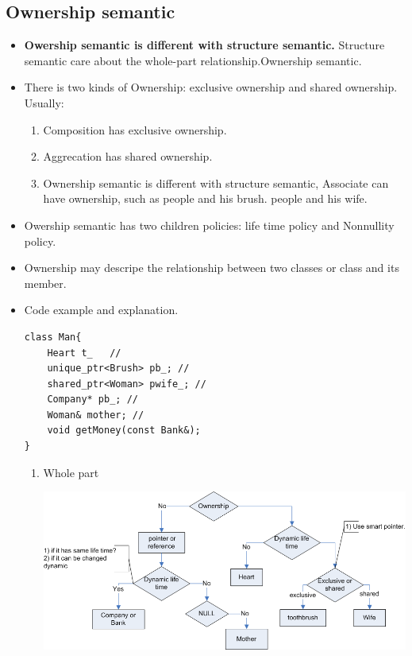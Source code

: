 \documentclass[a4paper,11pt,twoside]{book}
\begin{document}
\subsection{Ownership semantic}
\begin{itemize}
	\item \textbf{Owership semantic is different with structure semantic.} Structure semantic care about the whole-part relationship.Ownership semantic. 
	
	\item There is two kinds of Ownership: exclusive ownership and shared ownership. Usually:
	\begin{enumerate}
		\item Composition has exclusive ownership.
		\item Aggrecation has shared ownership.
		\item Ownership semantic is different with structure semantic, Associate can have ownership, such as people and his brush. people and his wife.
	\end{enumerate}
	
	\item Owership semantic has two children policies: life time policy and Nonnullity policy. 
	
	\item Ownership may descripe the relationship between two classes or class and its member.
	
	\item Code example and explanation. 
\begin{lstlisting}
class Man{
	Heart t_   //
	unique_ptr<Brush> pb_; //
	shared_ptr<Woman> pwife_; // 
	Company* pb_; //
	Woman& mother; //
	void getMoney(const Bank&);
}
\end{lstlisting}
\begin{enumerate}
\item Whole part

	\centering
	\includegraphics[width=0.9\linewidth]{pics/owner.png}


\end{enumerate}
\end{itemize}
\end{document}
